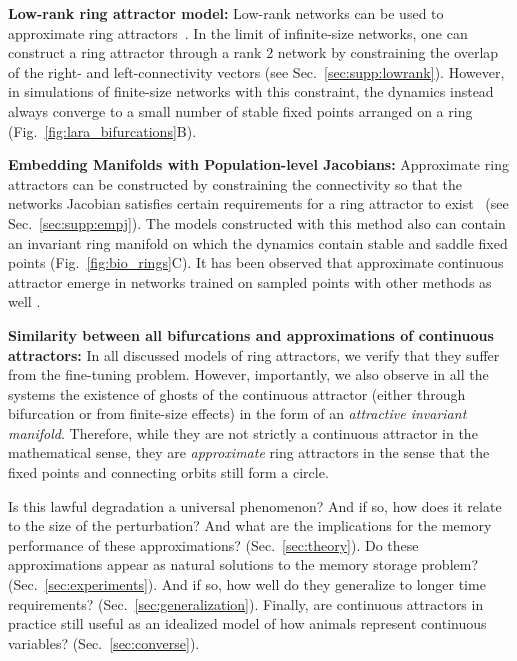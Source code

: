 \documentclass{article} %
\newcommand{\ptitle}[1]{\textbf{#1:}\xspace}
\newcounter{ct}
\theoremstyle{definition}
\theoremstyle{remark}
\begin{document}
\ptitle{Low-rank ring attractor model} %
Low-rank networks can be used to approximate ring attractors~\citep{mastrogiuseppe2018, beiran2021}.
In the limit of infinite-size networks, one can construct a ring attractor through a rank 2 network by constraining the overlap of the right- and left-connectivity vectors (see Sec.~\ref{sec:supp:lowrank}).
However, in simulations of finite-size networks with this constraint, the dynamics instead always converge to a small number of stable fixed points arranged on a ring (Fig.~\ref{fig:lara_bifurcations}B).

\ptitle{Embedding Manifolds with Population-level Jacobians} %
Approximate ring attractors can be constructed by constraining the connectivity so that the networks Jacobian satisfies certain requirements for a ring attractor to exist~\citep{pollock2020} (see Sec.~\ref{sec:supp:empj}).
The models constructed with this method also can contain an invariant ring manifold on which the dynamics contain stable and saddle fixed points (Fig.~\ref{fig:bio_rings}C).
It has been observed that approximate continuous attractor emerge in networks trained on sampled points with other methods as well \citep{darshan2022}.

\ptitle{Similarity between all bifurcations and approximations of continuous attractors}
In all discussed models of ring attractors, we verify that they suffer from the fine-tuning problem.
However, importantly, we also observe in all the systems  the existence of ghosts of the continuous attractor (either through bifurcation or from finite-size effects) in the form of an \emph{attractive invariant manifold}.
Therefore, while they are not strictly a continuous attractor in the mathematical sense, they are \textit{approximate} ring attractors in the sense that the fixed points and connecting orbits still form a circle.

Is this lawful degradation a universal phenomenon?
 And if so, how does it relate to the size of the perturbation? And what are the implications for the memory performance of these approximations? (Sec.~\ref{sec:theory}).
Do these approximations appear as natural solutions to the memory storage problem? (Sec.~\ref{sec:experiments}).
 And if so, how well do they generalize to longer time requirements? (Sec.~\ref{sec:generalization}).
 Finally, are continuous attractors in practice still useful as an idealized model of how animals represent continuous variables? (Sec.~\ref{sec:converse}).
\end{document}
